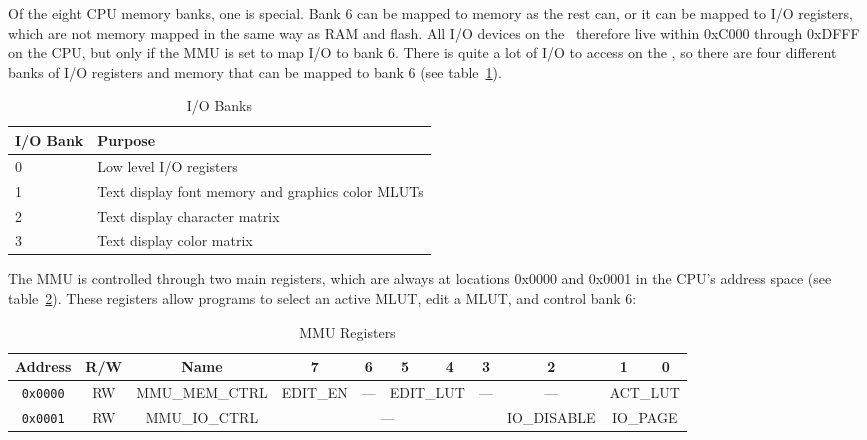 Of the eight CPU memory banks, one is special. Bank 6 can be mapped to memory as the rest can, or it can be mapped to I/O registers, which are not memory mapped in the same way as RAM and flash. All I/O devices on the \jr\ therefore live within 0xC000 through 0xDFFF on the CPU, but only if the MMU is set to map I/O to bank 6. There is quite a lot of I/O to access on the \jr, so there are four different banks of I/O registers and memory that can be mapped to bank 6 (see table~\ref{tab:io_banks}).

\begin{table}[ht]
	\begin{center}
		\begin{tabular}{| l | l |} \hline
			I/O Bank & Purpose \\ \hline\hline
			0 & Low level I/O registers \\ \hline
			1 & Text display font memory and graphics color MLUTs \\ \hline
			2 & Text display character matrix \\ \hline
			3 & Text display color matrix \\ \hline
		\end{tabular}
	\end{center}
	\caption{I/O Banks}
	\label{tab:io_banks}
\end{table}

The MMU is controlled through two main registers, which are always at locations 0x0000 and 0x0001 in the CPU's address space (see table~\ref{tab:mmu_registers}). These registers allow programs to select an active MLUT, edit a MLUT, and control bank 6:

\begin{table}[ht]
	\begin{center}
		\begin{tabular}{| c | c | c || c | c | c | c | c | c | c | c |} \hline
			Address & R/W & Name & 7 & 6 & 5 & 4 & 3 & 2 & 1 & 0 \\ \hline\hline
			\verb+0x0000+ & RW & MMU\_MEM\_CTRL & EDIT\_EN & --- & \multicolumn{2}{|c|}{EDIT\_LUT} & --- & --- & \multicolumn{2}{|c|}{ACT\_LUT} \\ \hline
			\verb+0x0001+ & RW & MMU\_IO\_CTRL & \multicolumn{5}{|c|}{---} & IO\_DISABLE & \multicolumn{2}{|c|}{IO\_PAGE} \\ \hline
		\end{tabular}
	\end{center}
	\caption{MMU Registers}
	\label{tab:mmu_registers}
\end{table}

